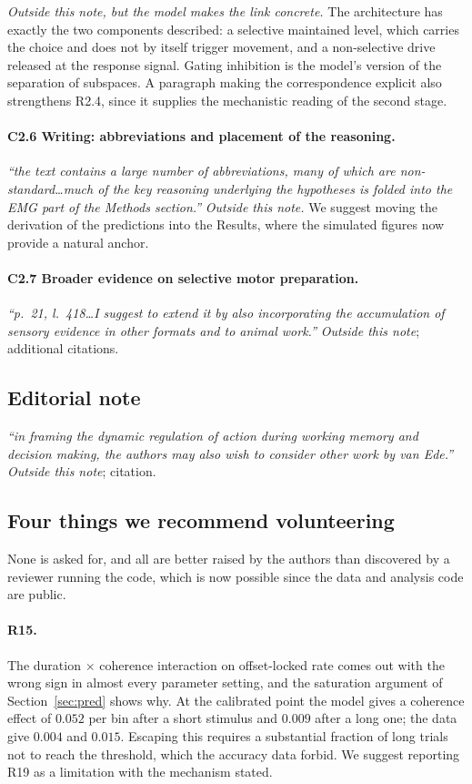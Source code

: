\documentclass[a4paper,11pt]{article}
\newcommand{\1}{\mathbbm{1}}
\begin{document}
\emph{Outside this note, but the model makes the link concrete.} The architecture has
exactly the two components described: a selective maintained level, which carries the
choice and does not by itself trigger movement, and a non-selective drive released at
the response signal. Gating inhibition is the model's version of the separation of
subspaces. A paragraph making the correspondence explicit also strengthens R2.4, since
it supplies the mechanistic reading of the second stage.

\paragraph{C2.6 Writing: abbreviations and placement of the reasoning.}
\emph{``the text contains a large number of abbreviations, many of which are
non-standard\ldots much of the key reasoning underlying the hypotheses is folded into
the EMG part of the Methods section.''}
\emph{Outside this note.} We suggest moving the derivation of the predictions into the
Results, where the simulated figures now provide a natural anchor.

\paragraph{C2.7 Broader evidence on selective motor preparation.}
\emph{``p.~21, l.~418\ldots I suggest to extend it by also incorporating the
accumulation of sensory evidence in other formats and to animal work.''}
\emph{Outside this note}; additional citations.

\subsection{Editorial note}

\emph{``in framing the dynamic regulation of action during working memory and decision
making, the authors may also wish to consider other work by van Ede.''}
\emph{Outside this note}; citation.

\subsection{Four things we recommend volunteering}

None is asked for, and all are better raised by the authors than discovered by a
reviewer running the code, which is now possible since the data and analysis code are
public.

\paragraph{R15.} The duration $\times$ coherence interaction on offset-locked rate comes
out with the wrong sign in almost every parameter setting, and the saturation argument of Section~\ref{sec:pred}
shows why. At the calibrated point the model gives a coherence effect of $0.052$ per bin
after a short stimulus and $0.009$ after a long one; the data give $0.004$ and $0.015$.
Escaping this requires a substantial fraction of long trials not to reach the threshold,
which the accuracy data forbid. We suggest reporting R19 as a limitation with the
mechanism stated.
\end{document}
